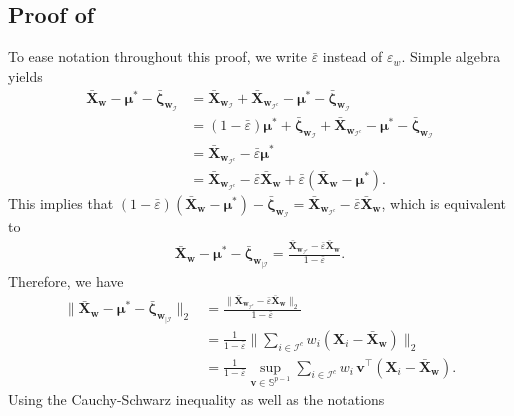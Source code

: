 \documentclass[aos,preprint,reqno]{imsart}
\newcommand\bs{\boldsymbol}
\newcommand\bmu{\boldsymbol\mu}
\newcommand\bzeta{\boldsymbol\zeta}
\newcommand\bv{\boldsymbol v}
\newcommand\bw{\boldsymbol w}
\theoremstyle{plain}
\theoremstyle{remark}
\begin{document}
\begin{figure}[omitted: a diagram of this paper's results, not reproduced here]\label{fig:diagram}\end{figure}    
	\subsection{Proof of }
	To ease notation throughout this proof, we write $\bar\varepsilon$ instead of 
	$\varepsilon_{w}$. Simple algebra yields
	\begin{align}
		\bar{\bs X}_{\bw} - \bmu^* - \bar{\bzeta}_{\bw_{\mathcal I}}  
		    &= \bar{\bs X}_{\bw_{\mathcal I}} + \bar{\bs X}_{\bw_{\mathcal I^c}} 
		        - \bmu^* - \bar{\bzeta}_{\bw_{\mathcal I}}  \\ 
			& = (1-\bar\varepsilon)\bmu^* + \bar{\bzeta}_{\bw_{\mathcal I}} + 
			    \bar{\bs X}_{\bw_{\mathcal I^c}} - \bmu^* - 
			    \bar{\bzeta}_{\bw_{\mathcal I}}\\
			& = \bar{\bs X}_{\bw_{\mathcal I^c}} - \bar\varepsilon\bmu^*\\
			& = \bar{\bs X}_{\bw_{\mathcal I^c}} - \bar\varepsilon\bar{\bs X}_{\bw} 
			    + \bar\varepsilon(\bar{\bs X}_{\bw} - \bmu^* ).
	\end{align}
	This implies that $(1-\bar\varepsilon)(\bar{\bs X}_{\bw} - \bmu^*) - 
	\bar{\bzeta}_{\bw_{\mathcal I}}  = \bar{\bs X}_{\bw_{\mathcal I^c}} 
	- \bar\varepsilon\bar{\bs X}_{\bw}$,  which is equivalent to 
	\begin{align}
			\bar{\bs X}_{\bw} - \bmu^* - \bar{\bzeta}_{\bw_{|\mathcal I}}  
			= \frac{\bar{\bs X}_{\bw_{\mathcal I^c}} - \bar\varepsilon\bar{\bs X}_{\bw}}
			{1-\bar\varepsilon}.\label{eq:p11a}
	\end{align}
	Therefore, we have 
	\begin{align}
		\big\|\bar{\bs X}_{\bw} - \bmu^* - 
		\bar{\bzeta}_{\bw_{|\mathcal I}}\big\|_2  
		& = \frac{\big\|\bar{\bs X}_{\bw_{\mathcal I^c}} - 
		\bar\varepsilon\bar{\bs X}_{\bw}\big\|_2}{1-\bar\varepsilon}\\
		& = \frac1{1-\bar\varepsilon} \bigg\|\sum_{i\in\mathcal I^c} 
		w_i(\bs X_i - \bar{\bs X}_{\bw})\bigg\|_2\\
		& = \frac1{1-\bar\varepsilon} \sup_{\bv\in\mathbb S^{p-1}} \sum_{i\in\mathcal I^c}
		w_i\,\bv^\top(\bs X_i - \bar{\bs X}_{\bw}).
			\label{eq:p11b}
	\end{align}
	Using the Cauchy-Schwarz inequality as well as the notations 
\end{document}
